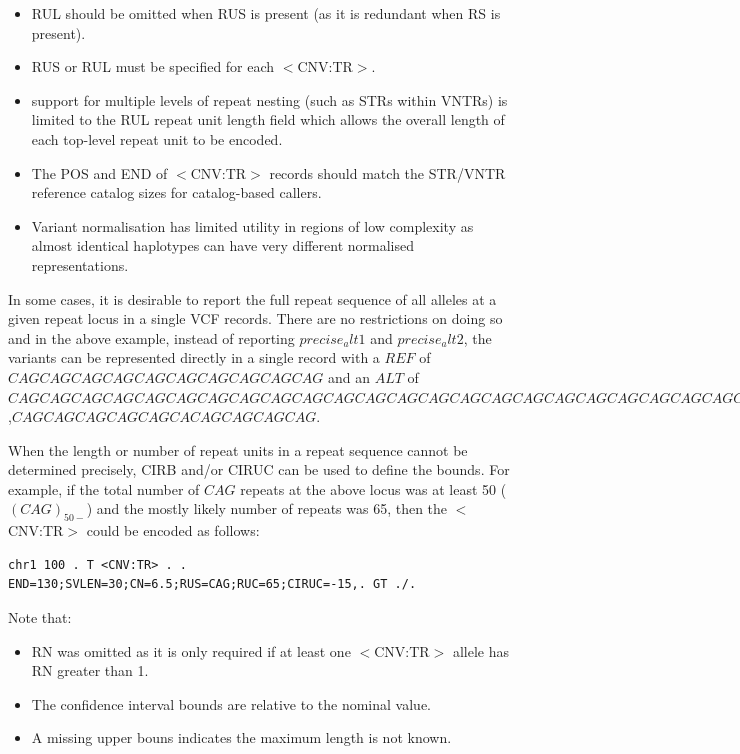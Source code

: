 \documentclass[8pt]{article}
\begin{document}
\begin{itemize}
    \item RUL should be omitted when RUS is present (as it is redundant when RS is present).
    \item RUS or RUL must be specified for each $<$CNV:TR$>$.
    \item support for multiple levels of repeat nesting (such as STRs within VNTRs) is limited to the RUL repeat unit length field which allows the overall length of each top-level repeat unit to be encoded.
    \item The POS and END of $<$CNV:TR$>$ records should match the STR/VNTR reference catalog sizes for catalog-based callers.
    \item Variant normalisation has limited utility in regions of low complexity as almost identical haplotypes can have very different normalised representations.
\end{itemize}

In some cases, it is desirable to report the full repeat sequence of all alleles at a given repeat locus in a single VCF records.
There are no restrictions on doing so and in the above example, instead of reporting $precise_alt1$ and $precise_alt2$, the variants can be represented directly in a single record with a $REF$ of $CAGCAGCAGCAGCAGCAGCAGCAGCAGCAG$ and an $ALT$ of $CAGCAGCAGCAGCAGCAGCAGCAGCAGCAGCAGCAGCAGCAGCAGCAGCAGCAGCAGCAGCAGCAGCAGCAGCAGCAGCAGCAGCAGCAG$,$CAGCAGCAGCAGCAGCACAGCAGCAGCAG$.


When the length or number of repeat units in a repeat sequence cannot be determined precisely, CIRB and/or CIRUC can be used to define the bounds.
For example, if the total number of $CAG$ repeats at the above locus was at least 50 ($(CAG)_{50-}$) and the mostly likely number of repeats was 65, then the $<$CNV:TR$>$ could be encoded as follows:

\footnotesize
\begin{verbatim}
chr1 100 . T <CNV:TR> . . END=130;SVLEN=30;CN=6.5;RUS=CAG;RUC=65;CIRUC=-15,. GT ./.
\end{verbatim}
\normalsize

Note that:
\begin{itemize}
	\item RN was omitted as it is only required if at least one $<$CNV:TR$>$ allele has RN greater than 1.
	\item The confidence interval bounds are relative to the nominal value.
	\item A missing upper bouns indicates the maximum length is not known.
\end{itemize}
\end{document}
